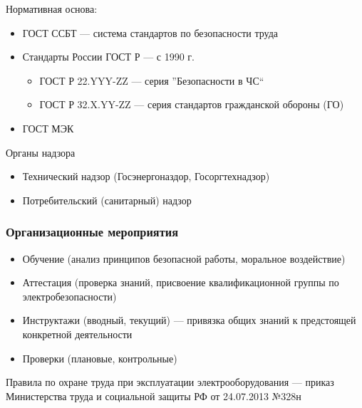 \documentclass[a4paper, 14pt]{extarticle}
\begin{document}
Нормативная основа:
\begin{itemize}
    \item ГОСТ ССБТ --- система стандартов по безопасности труда
    \item Стандарты России ГОСТ Р --- с 1990 г.
    \begin{itemize}
        \item ГОСТ Р 22.YYY-ZZ --- серия ''Безопасности в ЧС``
        \item ГОСТ Р 32.X.YY-ZZ --- серия стандартов гражданской обороны (ГО)
    \end{itemize}
    \item ГОСТ МЭК
\end{itemize}

Органы надзора
\begin{itemize}
    \item Технический надзор (Госэнергоназдор, Госоргтехнадзор)
    \item Потребительский (санитарный) надзор
\end{itemize}

\subsubsection*{Организационные мероприятия}
\begin{itemize}
    \item Обучение (анализ принципов безопасной работы, моральное воздействие)
    \item Аттестация (проверка знаний, присвоение квалификационной группы по электробезопасности)
    \item Инструктажи (вводный, текущий) --- привязка общих знаний к предстоящей конкретной деятельности
    \item Проверки (плановые, контрольные)
\end{itemize}
Правила по охране труда при эксплуатации электрооборудования --- приказ Министерства труда и социальной защиты РФ от 24.07.2013 №328н
\end{document}
